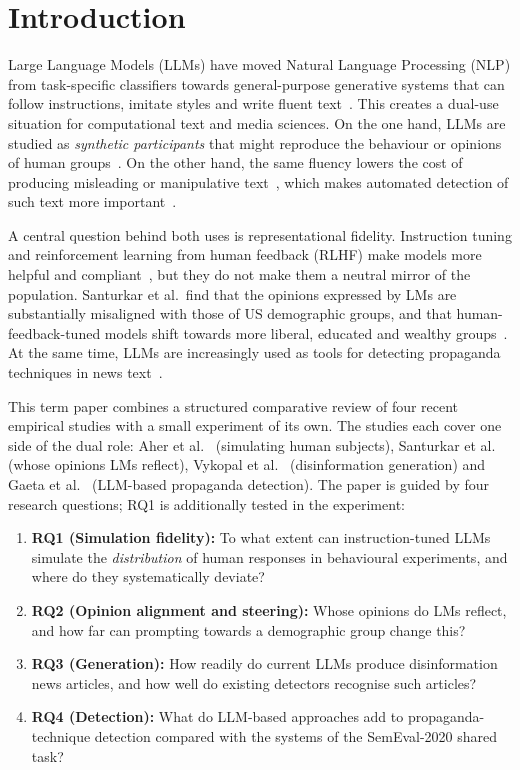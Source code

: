 \section{Introduction}
\label{sec:introduction}

Large Language Models (LLMs) have moved Natural Language Processing (NLP) from task-specific classifiers towards general-purpose generative systems that can follow instructions, imitate styles and write fluent text~\cite{brown2020language, openai2023gpt4}. This creates a dual-use situation for computational text and media sciences. On the one hand, LLMs are studied as \emph{synthetic participants} that might reproduce the behaviour or opinions of human groups~\cite{aher2023using, santurkar2023whose}. On the other hand, the same fluency lowers the cost of producing misleading or manipulative text~\cite{wardle2017information, buchanan2021truth, vykopal2024disinformation}, which makes automated detection of such text more important~\cite{dasanmartino2020semeval, gaeta2025towards}.

A central question behind both uses is representational fidelity. Instruction tuning and reinforcement learning from human feedback (RLHF) make models more helpful and compliant~\cite{ouyang2022training}, but they do not make them a neutral mirror of the population. Santurkar et al.\ find that the opinions expressed by LMs are substantially misaligned with those of US demographic groups, and that human-feedback-tuned models shift towards more liberal, educated and wealthy groups~\cite{santurkar2023whose}. At the same time, LLMs are increasingly used as tools for detecting propaganda techniques in news text~\cite{gaeta2025towards}.

This term paper combines a structured comparative review of four recent empirical studies with a small experiment of its own. The studies each cover one side of the dual role: Aher et al.~\cite{aher2023using} (simulating human subjects), Santurkar et al.~\cite{santurkar2023whose} (whose opinions LMs reflect), Vykopal et al.~\cite{vykopal2024disinformation} (disinformation generation) and Gaeta et al.~\cite{gaeta2025towards} (LLM-based propaganda detection). The paper is guided by four research questions; RQ1 is additionally tested in the experiment:
\begin{enumerate}
    \item \textbf{RQ1 (Simulation fidelity):} To what extent can instruction-tuned LLMs simulate the \emph{distribution} of human responses in behavioural experiments, and where do they systematically deviate?
    \item \textbf{RQ2 (Opinion alignment and steering):} Whose opinions do LMs reflect, and how far can prompting towards a demographic group change this?
    \item \textbf{RQ3 (Generation):} How readily do current LLMs produce disinformation news articles, and how well do existing detectors recognise such articles?
    \item \textbf{RQ4 (Detection):} What do LLM-based approaches add to propaganda-technique detection compared with the systems of the SemEval-2020 shared task?
\end{enumerate}

